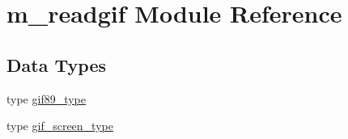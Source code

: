 \hypertarget{namespacem__readgif}{}\section{m\+\_\+readgif Module Reference}
\label{namespacem__readgif}
\subsection*{Data Types}
\begin{DoxyCompactItemize}
\item 
type \mbox{\hyperlink{structm__readgif_1_1gif89__type}{gif89\+\_\+type}}
\item 
type \mbox{\hyperlink{structm__readgif_1_1gif__screen__type}{gif\+\_\+screen\+\_\+type}}
\end{DoxyCompactItemize}
